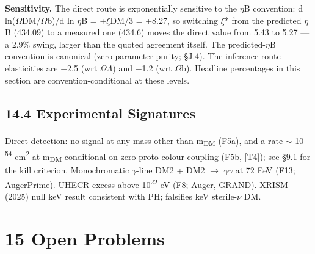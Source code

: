 \documentclass[11pt,letterpaper]{article}
\begin{document}
\noindent \textbf{Sensitivity. }The direct route is exponentially sensitive to the $\eta$B convention: d ln($\Omega$DM/$\Omega$b)/d ln $\eta$B = +$\xi$DM/3 = +8.27, so switching $\xi$* from the predicted $\eta$B (434.09) to a measured one (434.6) moves the direct value from 5.43 to 5.27 --- a 2.9\% swing, larger than the quoted agreement itself. The predicted-$\eta$B convention is canonical (zero-parameter purity; §J.4). The inference route elasticities are $-$2.5 (wrt $\Omega$$\Lambda$) and $-$1.2 (wrt $\Omega$b). Headline percentages in this section are convention-conditional at these levels.

\subsection*{14.4  Experimental Signatures}

\noindent Direct detection: no signal at any mass other than m\textsubscript{DM} (F5a), and a rate $\sim$ 10\textsuperscript{-54} cm\textsuperscript{2} at m\textsubscript{DM} conditional on zero proto-colour coupling (F5b, [T4]); see §9.1 for the kill criterion. Monochromatic $\gamma$-line DM2 + DM2 $\to$ $\gamma$$\gamma$ at 72 EeV (F13; AugerPrime). UHECR excess above 10\textsuperscript{22} eV (F8; Auger, GRAND). XRISM (2025) null keV result consistent with PH; falsifies keV sterile-$\nu$ DM.

\section*{15  Open Problems}
\end{document}
